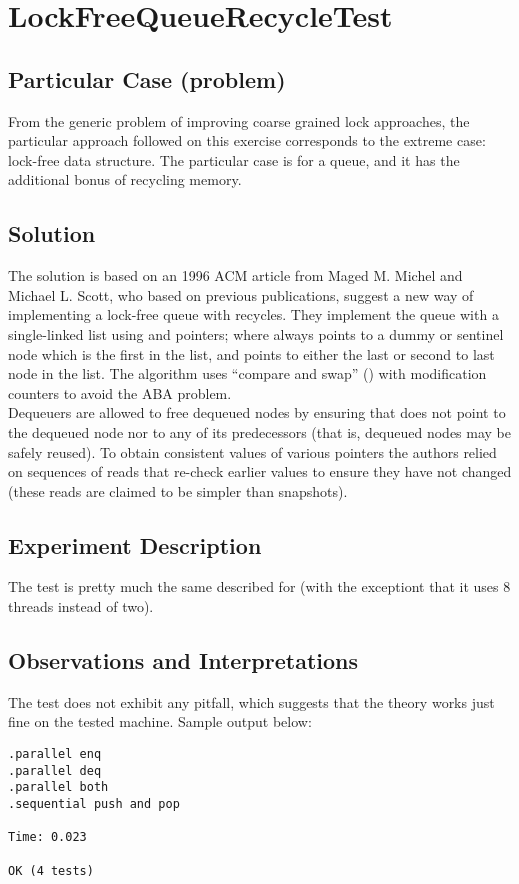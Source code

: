 \section{\textbf{LockFreeQueueRecycleTest}}

\subsection{Particular Case (problem)}
From the generic problem of improving coarse grained lock approaches,
the particular approach followed on this exercise corresponds to the
extreme case: lock-free data structure. The particular case is for a
queue, and it has the additional bonus of recycling memory.

\subsection{Solution}
The solution is based on an 1996 ACM article from Maged M. Michel and
Michael L. Scott, who based on previous publications, suggest a new
way of implementing a lock-free queue with recycles. They implement the
queue with a single-linked list using  and  pointers;
where  always points to a dummy or sentinel node which is the
first in the list, and  points to either the last or second to
last node in the list. The algorithm uses ``compare and swap''
() with modification counters to avoid the ABA problem. \\

Dequeuers are allowed to free dequeued nodes by ensuring that 
does not point to the dequeued node nor to any of its predecessors
(that is, dequeued nodes may be safely reused). To obtain consistent
values of various pointers the authors relied on sequences of reads
that re-check earlier values to ensure they have not changed (these
reads are claimed to be simpler than snapshots). 

\subsection{Experiment Description}
The test is pretty much the same described for 
(with the exceptiont that it uses 8 threads instead of two).

\subsection{Observations and Interpretations}
The test does not exhibit any pitfall, which suggests that the theory
works just fine on the tested machine. Sample output below:

\begin{verbatim}
.parallel enq
.parallel deq
.parallel both
.sequential push and pop

Time: 0.023

OK (4 tests)
\end{verbatim}
\hfill

